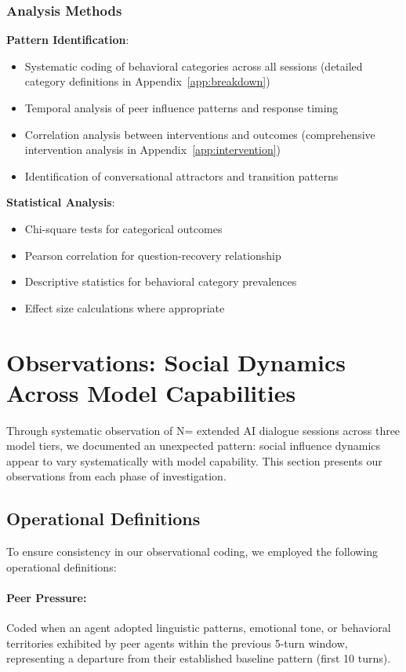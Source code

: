 \documentclass[11pt,letterpaper]{article}
\newcommand{\exponedataTotalSessionsRaw}{67}
\newcommand{\exptwoTotalSessionsRaw}{61}
\newcommand{\expthreeTotalSessionsRaw}{100}
\newcommand{\totalAllPhasesRaw}{\fpeval{\exponedataTotalSessionsRaw + \exptwoTotalSessionsRaw + \expthreeTotalSessionsRaw}}
\newcommand{\totalAllPhases}{N=\totalAllPhasesRaw}
\begin{document}
\subsubsection{Analysis Methods}

\textbf{Pattern Identification}:
\begin{itemize}
    \item Systematic coding of behavioral categories across all sessions (detailed category definitions in Appendix~\ref{app:breakdown})
    \item Temporal analysis of peer influence patterns and response timing
    \item Correlation analysis between interventions and outcomes (comprehensive intervention analysis in Appendix~\ref{app:intervention})
    \item Identification of conversational attractors and transition patterns
\end{itemize}

\textbf{Statistical Analysis}:
\begin{itemize}
    \item Chi-square tests for categorical outcomes
    \item Pearson correlation for question-recovery relationship
    \item Descriptive statistics for behavioral category prevalences
    \item Effect size calculations where appropriate
\end{itemize}

\section{Observations: Social Dynamics Across Model Capabilities}

Through systematic observation of \totalAllPhases{} extended AI dialogue sessions across three model tiers, we documented an unexpected pattern: social influence dynamics appear to vary systematically with model capability. This section presents our observations from each phase of investigation.

\subsection{Operational Definitions}

To ensure consistency in our observational coding, we employed the following operational definitions:

\paragraph{Peer Pressure:} Coded when an agent adopted linguistic patterns, emotional tone, or behavioral territories exhibited by peer agents within the previous 5-turn window, representing a departure from their established baseline pattern (first 10 turns).
\end{document}
